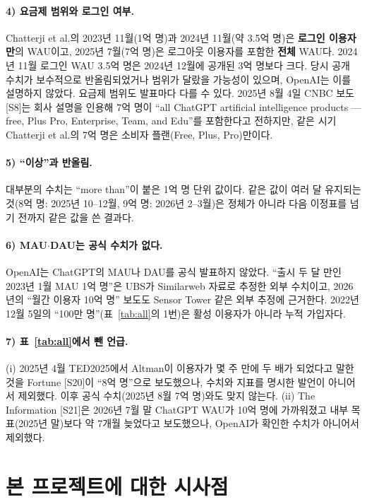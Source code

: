 \documentclass[11pt]{article}
\begin{document}
\paragraph{4) 요금제 범위와 로그인 여부.} Chatterji et al.의 2023년 11월(1억 명)과 2024년 11월(약 3.5억 명)은 \textbf{로그인 이용자만}의 WAU이고, 2025년 7월(7억 명)은 로그아웃 이용자를 포함한 \textbf{전체} WAU다. 2024년 11월 로그인 WAU 3.5억 명은 2024년 12월에 공개된 3억 명보다 크다. 당시 공개 수치가 보수적으로 반올림되었거나 범위가 달랐을 가능성이 있으며, OpenAI는 이를 설명하지 않았다. 요금제 범위도 발표마다 다를 수 있다. 2025년 8월 4일 CNBC 보도 [S8]는 회사 설명을 인용해 7억 명이 ``all ChatGPT artificial intelligence products --- free, Plus Pro, Enterprise, Team, and Edu''를 포함한다고 전하지만, 같은 시기 Chatterji et al.의 7억 명은 소비자 플랜(Free, Plus, Pro)만이다.

\paragraph{5) ``이상''과 반올림.} 대부분의 수치는 ``more than''이 붙은 1억 명 단위 값이다. 같은 값이 여러 달 유지되는 것(8억 명: 2025년 10--12월, 9억 명: 2026년 2--3월)은 정체가 아니라 다음 이정표를 넘기 전까지 같은 값을 쓴 결과다.

\paragraph{6) MAU$\cdot$DAU는 공식 수치가 없다.} OpenAI는 ChatGPT의 MAU나 DAU를 공식 발표하지 않았다. ``출시 두 달 만인 2023년 1월 MAU 1억 명''은 UBS가 Similarweb 자료로 추정한 외부 수치이고, 2026년의 ``월간 이용자 10억 명'' 보도도 Sensor Tower 같은 외부 추정에 근거한다. 2022년 12월 5일의 ``100만 명''(표~\ref{tab:all}의 1번)은 활성 이용자가 아니라 누적 가입자다.

\paragraph{7) 표~\ref{tab:all}에서 뺀 언급.} (i) 2025년 4월 TED2025에서 Altman이 이용자가 몇 주 만에 두 배가 되었다고 말한 것을 Fortune [S20]이 ``8억 명''으로 보도했으나, 수치와 지표를 명시한 발언이 아니어서 제외했다. 이후 공식 수치(2025년 8월 7억 명)와도 맞지 않는다. (ii) The Information [S21]은 2026년 7월 말 ChatGPT WAU가 10억 명에 가까워졌고 내부 목표(2025년 말)보다 약 7개월 늦었다고 보도했으나, OpenAI가 확인한 수치가 아니어서 제외했다.

\section{본 프로젝트에 대한 시사점}
\end{document}

